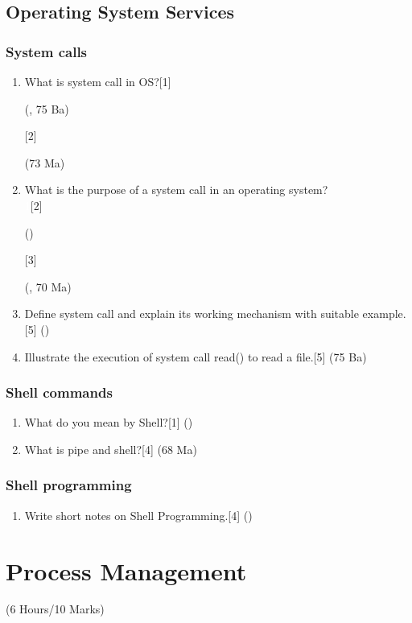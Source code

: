 \documentclass[12pt]{article}
\newcommand{\enter}{\textcolor{white}{1}}\ExplSyntaxOn
\begin{document}
\subsection{Operating System Services}
\subsubsection{System calls}
\begin{enumerate}
\item What is system call in OS?\hfill[1] \begin{small}(, 75 Ba)\end{small} [2] \begin{small}(73 Ma)\end{small}
\item What is the purpose of a system call in an operating system?\\
\enter\hfill[2] \begin{small}()\end{small} [3] \begin{small}(, 70 Ma)\end{small}
\item Define system call and explain its working mechanism with suitable example.\hfill[5] ()
\item Illustrate the execution of system call read() to read a file.\hfill[5] (75 Ba)
\end{enumerate}
\subsubsection{Shell commands}
\begin{enumerate}
\item What do you mean by Shell?\hfill[1] ()
\item What is pipe and shell?\hfill[4] (68 Ma)
\end{enumerate}
\subsubsection{Shell programming}
\begin{enumerate}
\item Write short notes on Shell Programming.\hfill[4] ()
\end{enumerate}

\pagebreak
\section{Process Management}
\begin{center}(6 Hours/10 Marks)\end{center}
\end{document}
